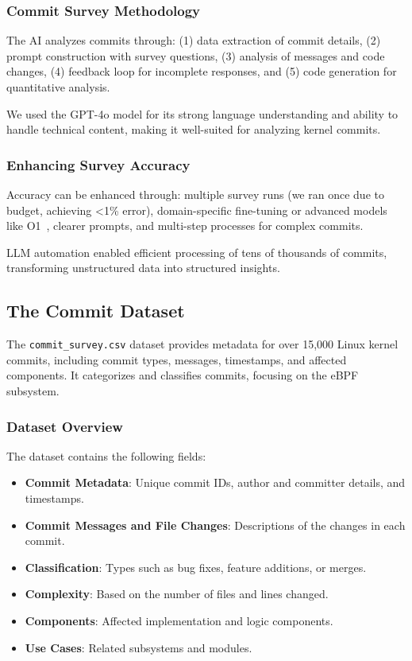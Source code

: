 \subsubsection{Commit Survey Methodology}

The AI analyzes commits through: (1) data extraction of commit details, (2) prompt construction with survey questions, (3) analysis of messages and code changes, (4) feedback loop for incomplete responses, and (5) code generation for quantitative analysis.

We used the GPT-4o model for its strong language understanding and ability to handle technical content, making it well-suited for analyzing kernel commits.

\subsubsection{Enhancing Survey Accuracy}

Accuracy can be enhanced through: multiple survey runs (we ran once due to budget, achieving <1\% error), domain-specific fine-tuning or advanced models like O1~\cite{o1}, clearer prompts, and multi-step processes for complex commits.

LLM automation enabled efficient processing of tens of thousands of commits, transforming unstructured data into structured insights.

\subsection{The Commit Dataset}

The \texttt{commit\_survey.csv} dataset provides metadata for over 15,000 Linux kernel commits, including commit types, messages, timestamps, and affected components. It categorizes and classifies commits, focusing on the eBPF subsystem.

\subsubsection{Dataset Overview}

The dataset contains the following fields:

\begin{itemize}
    \item \textbf{Commit Metadata}: Unique commit IDs, author and committer details, and timestamps.
    \item \textbf{Commit Messages and File Changes}: Descriptions of the changes in each commit.
    \item \textbf{Classification}: Types such as bug fixes, feature additions, or merges.
    \item \textbf{Complexity}: Based on the number of files and lines changed.
    \item \textbf{Components}: Affected implementation and logic components.
    \item \textbf{Use Cases}: Related subsystems and modules.
\end{itemize}

